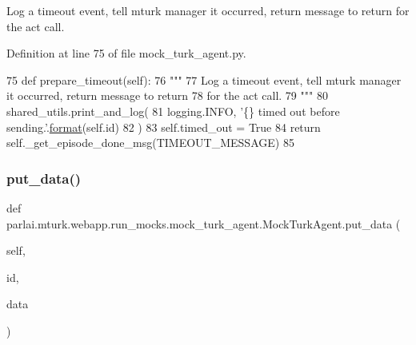 \begin{DoxyVerb}Log a timeout event, tell mturk manager it occurred, return message to return
for the act call.
\end{DoxyVerb}
 

Definition at line 75 of file mock\+\_\+turk\+\_\+agent.\+py.


\begin{DoxyCode}
75     \textcolor{keyword}{def }prepare\_timeout(self):
76         \textcolor{stringliteral}{"""}
77 \textcolor{stringliteral}{        Log a timeout event, tell mturk manager it occurred, return message to return}
78 \textcolor{stringliteral}{        for the act call.}
79 \textcolor{stringliteral}{        """}
80         shared\_utils.print\_and\_log(
81             logging.INFO, \textcolor{stringliteral}{'\{\} timed out before sending.'}.\hyperlink{namespaceparlai_1_1chat__service_1_1services_1_1messenger_1_1shared__utils_a32e2e2022b824fbaf80c747160b52a76}{format}(self.id)
82         )
83         self.timed\_out = \textcolor{keyword}{True}
84         \textcolor{keywordflow}{return} self.\_get\_episode\_done\_msg(TIMEOUT\_MESSAGE)
85 
\end{DoxyCode}
\mbox{\label{classparlai_1_1mturk_1_1webapp_1_1run__mocks_1_1mock__turk__agent_1_1MockTurkAgent_aa806b7a548bf73387b603edc23229afc}} 
\subsubsection{\texorpdfstring{put\+\_\+data()}{put\_data()}}
{\footnotesize\ttfamily def parlai.\+mturk.\+webapp.\+run\+\_\+mocks.\+mock\+\_\+turk\+\_\+agent.\+Mock\+Turk\+Agent.\+put\+\_\+data (\begin{DoxyParamCaption}\item[{}]{self,  }\item[{}]{id,  }\item[{}]{data }\end{DoxyParamCaption})}

